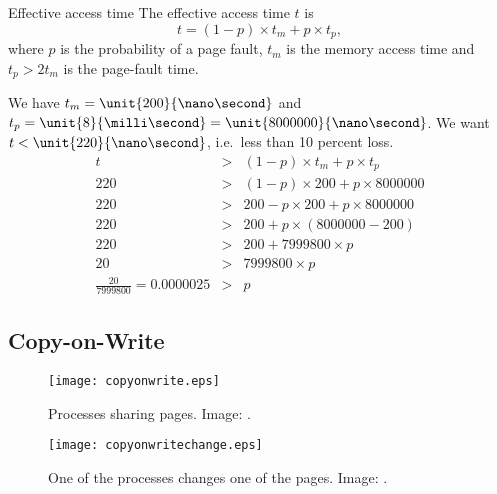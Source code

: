 \documentclass{beamer}
\begin{document}
\begin{frame}{\insertsubsectionhead}
  \begin{block}{Effective access time}
    The effective access time \(t\) is \[
      t = (1-p)\times t_m + p\times t_p,
    \] where \(p\) is the probability of a page fault, \(t_m\) is the memory 
    access time and \(t_p > 2 t_m\) is the page-fault time.
  \end{block}
\end{frame}

\begin{frame}{\insertsubsectionhead}
  \begin{example}
    We have \(t_m = \unit{200}{\nano\second}\) and \(t_p 
    = \unit{8}{\milli\second} = \unit{8000000}{\nano\second}\).
    We want \(t < \unit{220}{\nano\second}\), i.e.\ less than 10 percent loss.
    \begin{eqnarray}
      t &>& (1-p)\times t_m + p\times t_p \\
      220 &>& (1-p)\times 200 + p\times 8000000 \\
      220 &>& 200 - p\times 200 + p\times 8000000 \\
      220 &>& 200 + p\times (8000000 - 200) \\
      220 &>& 200 + 7999800\times p \\
      20 &>& 7999800\times p \\
      \frac{20}{7999800} = 0.0000025 &>& p
    \end{eqnarray}
  \end{example}
\end{frame}

\subsection{Copy-on-Write}

\begin{frame}{\insertsubsectionhead}
  \begin{figure}
    \texttt{[image: copyonwrite.eps]}
    \caption{Processes sharing pages.
      Image: \cite{Silberschatz2013osc}.}
  \end{figure}
\end{frame}

\begin{frame}{\insertsubsectionhead}
  \begin{figure}
    \texttt{[image: copyonwritechange.eps]}
    \caption{One of the processes changes one of the pages.
      Image: \cite{Silberschatz2013osc}.}
  \end{figure}
\end{frame}
\end{document}
